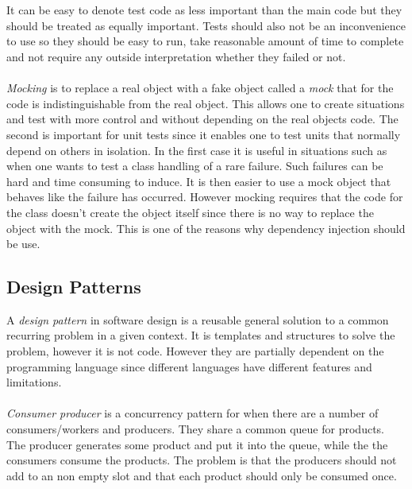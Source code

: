 \documentclass[10pt,a4paper]{report}
\begin{document}

\cite{cleancode2008}\\
\\
It can be easy to denote test code as less important than the main code but they should be treated as equally important. Tests should also not be an inconvenience to use so they should be easy to run, take reasonable amount of time to complete and not require any outside interpretation whether they failed or not.\cite{cleancode2008}\\
\\
\emph{Mocking} is to replace a real object with a fake object called a \emph{mock} that for the code is indistinguishable from the real object. This allows one to create situations and test with more control and without depending on the real objects code. The second is important for unit tests since it enables one to test units that normally depend on others in isolation. In the first case it is useful in situations such as when one wants to test a class handling of a rare failure. Such failures can be hard and time consuming to induce. It is then easier to use a mock object that behaves like the failure has occurred. However mocking requires that the code for the class doesn't create the object itself since there is no way to replace the object with the mock. This is one of the reasons why dependency injection should be use.\cite{cleancode2008}

\subsection{Design Patterns}
\label{design_pattern}
A \emph{design pattern} in software design is a reusable general solution to a common recurring problem in a given context. It is templates and structures to solve the problem, however it is not code. However they are partially dependent on the programming language since different languages have different features and limitations.\cite{design_patterns}\\
\\
\emph{Consumer producer} is a concurrency pattern for when there are a number of consumers/workers and producers. They share a common queue for products. The producer generates some product and put it into the queue, while the the consumers consume the products. The problem is that the producers should not add to an non empty slot and that each product should only be consumed once.\cite{cleancode2008, design_patterns}
\end{document}
